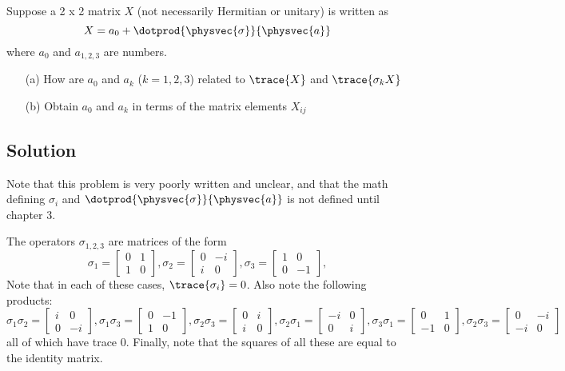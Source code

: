 Suppose a 2 x 2 matrix $X$ (not necessarily Hermitian or unitary) is
written as
\[ X = a_0 + \dotprod{\physvec{\sigma}}{\physvec{a}}\]
where $a_0$ and $a_{1,2,3}$ are numbers.
\begin{itemize}
  \item[(a)] How are $a_0$ and $a_{k}$ ($k = 1,2,3$) related to
    $\trace{X}$ and $\trace{\sigma_k X}$
  \item[(b)] Obtain $a_0$ and $a_k$ in terms of the matrix elements $X_{ij}$
\end{itemize}

\subsection*{Solution}
Note that this problem is very poorly written and unclear, and that
the math defining $\sigma_i$ and
$\dotprod{\physvec{\sigma}}{\physvec{a}}$ is not defined until chapter
3.

The operators $\sigma_{1,2,3}$ are matrices of the form
\[
\sigma_1 =
\begin{bmatrix}
  0 & 1 \\
  1 & 0
\end{bmatrix},
\sigma_2 =
\begin{bmatrix}
  0 & -i \\
  i & 0
\end{bmatrix},
\sigma_3 =
\begin{bmatrix}
  1 & 0 \\
  0 & -1
\end{bmatrix},
\]
Note that in each of these cases, $\trace{\sigma_i} = 0$.  Also note the following products:
\[
\sigma_1\sigma_2 =
\begin{bmatrix}
  i & 0 \\
  0 & -i
\end{bmatrix},
\sigma_1\sigma_3 =
\begin{bmatrix}
  0 & -1 \\
  1 & 0
\end{bmatrix},
\sigma_2\sigma_3 =
\begin{bmatrix}
  0 & i \\
  i & 0
\end{bmatrix},
\sigma_2\sigma_1 =
\begin{bmatrix}
  -i & 0 \\
  0 & i
\end{bmatrix},
\sigma_3\sigma_1 =
\begin{bmatrix}
  0 & 1 \\
  -1 & 0
\end{bmatrix},
\sigma_2\sigma_3 =
\begin{bmatrix}
  0 & -i \\
  -i & 0
\end{bmatrix}
\]
all of which have trace 0.  Finally, note that the squares of all
these are equal to the identity matrix.


